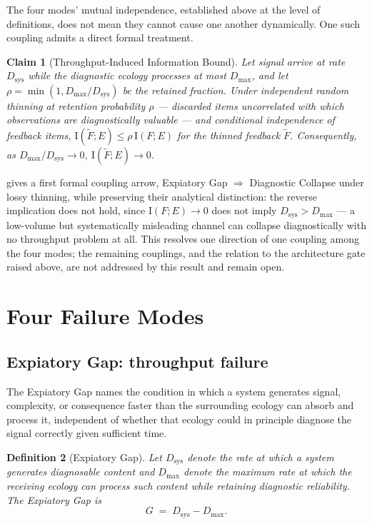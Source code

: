 \documentclass[12pt]{report}
\newtheorem{definition}{Definition}[section]
\newtheorem{claim}[definition]{Claim}
\newcommand{\I}{\ensuremath{\mathrm{I}}}
\begin{document}
The four modes' mutual independence, established above at the level of
definitions, does not mean they cannot cause one another dynamically. One
such coupling admits a direct formal treatment.

\begin{claim}[Throughput-Induced Information Bound]
\label{thm:throughput-info}
Let signal arrive at rate $D_{\mathrm{sys}}$ while the diagnostic ecology
processes at most $D_{\max}$, and let $\rho = \min(1, D_{\max}/D_{\mathrm{sys}})$
be the retained fraction. Under independent random thinning at retention
probability $\rho$ --- discarded items uncorrelated with which
observations are diagnostically valuable --- and conditional independence
of feedback items, $\I(\widetilde{F};E) \leq \rho \, \I(F;E)$ for the
thinned feedback $\widetilde{F}$. Consequently, as $D_{\max}/D_{\mathrm{sys}}
\to 0$, $\I(\widetilde{F};E) \to 0$.
\end{claim}

 gives a first formal coupling arrow, Expiatory
Gap $\Rightarrow$ Diagnostic Collapse under lossy thinning, while
preserving their analytical distinction: the reverse implication does not
hold, since $\I(F;E) \to 0$ does not imply $D_{\mathrm{sys}} > D_{\max}$
--- a low-volume but systematically misleading channel can collapse
diagnostically with no throughput problem at all. This resolves one
direction of one coupling among the four modes; the remaining couplings,
and the relation to the architecture gate raised above, are not addressed
by this result and remain open.

\section{Four Failure Modes}
\label{sec:four-modes}

\subsection{Expiatory Gap: throughput failure}
\label{subsec:expiatory-gap}

The Expiatory Gap names the condition in which a system generates signal,
complexity, or consequence faster than the surrounding ecology can absorb
and process it, independent of whether that ecology could in principle
diagnose the signal correctly given sufficient time.

\begin{definition}[Expiatory Gap]
Let $D_{\mathrm{sys}}$ denote the rate at which a system generates
diagnosable content and $D_{\max}$ denote the maximum rate at which the
receiving ecology can process such content while retaining diagnostic
reliability. The Expiatory Gap is
\[
G \;=\; D_{\mathrm{sys}} - D_{\max}.
\]
\end{definition}
\end{document}

